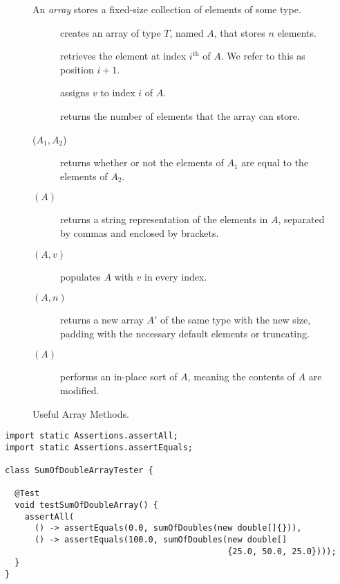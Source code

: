 \begin{figure}[tp]
  \small
  \begin{tcolorbox}[title=Java Arrays]
    An \emph{array} stores a fixed-size collection of elements of some type.
    \vspace{2ex}
  \begin{description}
    \item [] creates an array of type $T$, named $A$, that stores $n$ elements.
    \item [] retrieves the element at index $i^{\text{th}}$ of $A$. We refer to this as position $i + 1$.
    \item [] assigns $v$ to index $i$ of $A$.
    \item [] returns the number of elements that the array can store.
    \item [($A_1, A_2$)] returns whether or not the elements of $A_1$ are equal to the elements of $A_2$.
    \item [$(A)$] returns a string representation of the elements in $A$, separated by commas and enclosed by brackets.
    \item [$(A, v)$] populates $A$ with $v$ in every index.
    \item [$(A, n)$] returns a new array $A'$ of the same type with the new size, padding with the necessary default elements or truncating.
    \item [$(A)$] performs an in-place sort of $A$, meaning the contents of $A$ are modified.
  \end{description}
\end{tcolorbox}
  \caption{Useful Array Methods.}
  \label{fig:arrays}
\end{figure}


\begin{lstlisting}[language=MyJava]
import static Assertions.assertAll;
import static Assertions.assertEquals;

class SumOfDoubleArrayTester {

  @Test
  void testSumOfDoubleArray() {
    assertAll(
      () -> assertEquals(0.0, sumOfDoubles(new double[]{})),
      () -> assertEquals(100.0, sumOfDoubles(new double[]
                                             {25.0, 50.0, 25.0})));
  }
}
\end{lstlisting}

